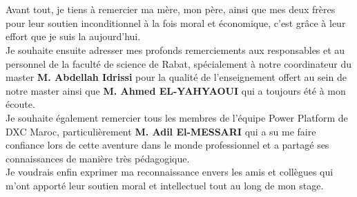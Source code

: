 \titleformat{\chapter}[display]
{\normalfont\huge\bfseries}{\filcenter\underline{\MakeUppercase{{\chaptertitlename}}\ \thechapter}}{20pt}{\Huge}

\titlespacing*{\chapter}{0pt}{1.80in}{0in}
\chapter*{}
\titlespacing*{\chapter}{0pt}{0.45in}{0.3in}%
\vspace{1in}


Avant tout, je tiens à remercier ma mère, mon père, ainsi que mes deux frères pour leur soutien inconditionnel à la fois moral et économique, c’est  grâce à leur effort que je suis la aujourd’hui. \\

Je souhaite ensuite adresser mes profonds remerciements aux responsables et au personnel de la faculté de science de Rabat, spécialement à notre coordinateur du master \textbf{M. Abdellah Idrissi} pour la qualité de l’enseignement offert au sein de notre master ainsi que \textbf{M. Ahmed EL-YAHYAOUI} qui a toujours été à mon écoute. 
\\

Je souhaite également remercier tous les membres de l’équipe Power Platform de DXC Maroc, particulièrement \textbf{M. Adil El-MESSARI} qui a su me faire confiance lors de cette aventure dans le monde professionnel et a partagé ses connaissances de manière très pédagogique.\\ %

Je voudrais enfin exprimer ma reconnaissance envers les amis et collègues qui m’ont apporté leur soutien moral et intellectuel tout au long de mon stage.



